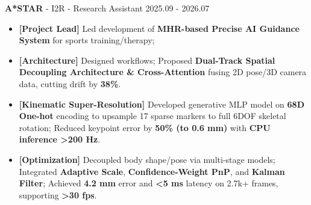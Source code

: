 \documentclass[10pt,a4paper]{article}
\begin{document}
{\fontsize{12pt}{14.4pt}\selectfont\noindent\textbf{A*STAR} - I2R - Research Assistant \hfill 2025.09 - 2026.07\par}
\begin{itemize}[leftmargin=1em, label=, itemsep=0.35ex, topsep=0.05ex]
\item \textbf{[Project Lead]} Led development of \textbf{MHR-based Precise AI Guidance System} for sports training/therapy; 
\item \textbf{[Architecture]} Designed workflows; Proposed \textbf{Dual-Track Spatial Decoupling Architecture \& Cross-Attention} fusing 2D pose/3D camera data, cutting drift by \textbf{38\%}.
\item \textbf{[Kinematic Super-Resolution]} Developed generative MLP model on \textbf{68D One-hot} encoding to upsample 17 sparse markers to full 6DOF skeletal rotation; Reduced keypoint error by \textbf{50\% (to 0.6 mm)} with \textbf{CPU inference >200 Hz}.
\item \textbf{[Optimization]} Decoupled body shape/pose via multi-stage models; Integrated \textbf{Adaptive Scale}, \textbf{Confidence-Weight PnP}, and \textbf{Kalman Filter}; Achieved \textbf{4.2 mm} error and \textbf{<5 ms} latency on 2.7k+ frames, supporting \textbf{>30 fps}.
\end{itemize}
\vspace{0.2ex}
\end{document}
